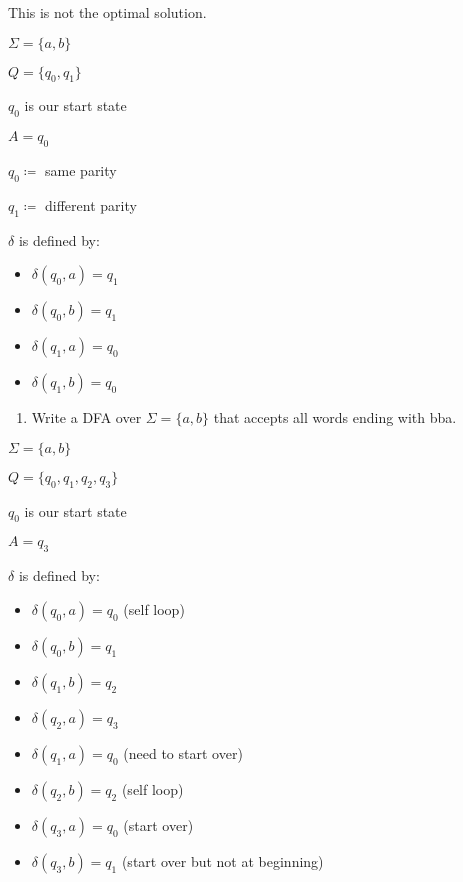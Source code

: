 \documentclass{article}
\begin{document}
This is not the optimal solution.

\(\Sigma = \{a,b\}\)

\(Q = \{q_0, q_1\}\)

\(q_0\) is our start state

\(A = q_0\)

\(q_0 \coloneqq\) same parity

\(q_1 \coloneqq\) different parity

\(\delta\) is defined by:
\begin{itemize}
    \item \(\delta(q_0, a) = q_1\)
    \item \(\delta(q_0, b) = q_1\)
    \item \(\delta(q_1, a) = q_0\)
    \item \(\delta(q_1, b) = q_0\)
\end{itemize}


\begin{enumerate}
\def\labelenumi{\arabic{enumi}.}
\setcounter{enumi}{3}

\item
  Write a DFA over \(\Sigma = \{a, b\}\) that accepts all words ending
  with bba.
\end{enumerate}

\(\Sigma = \{a,b\}\)

\(Q = \{q_0, q_1, q_2, q_3\}\)

\(q_0\) is our start state

\(A = q_3\)

\(\delta\) is defined by:
\begin{itemize}
    \item \(\delta(q_0, a) = q_0\) (self loop)
    \item \(\delta(q_0, b) = q_1\)
    \item \(\delta(q_1, b) = q_2\)
    \item \(\delta(q_2, a) = q_3\)
    \item \(\delta(q_1, a) = q_0\) (need to start over)
    \item \(\delta(q_2, b) = q_2\) (self loop)
    \item \(\delta(q_3, a) = q_0\) (start over)
    \item \(\delta(q_3, b) = q_1\) (start over but not at beginning)
\end{itemize}


\end{document}
